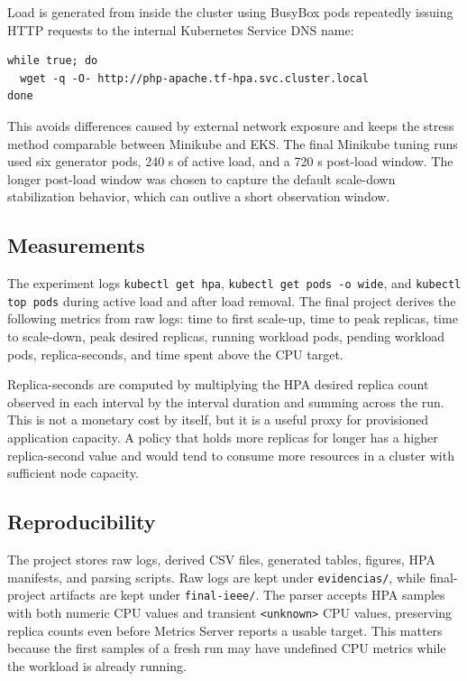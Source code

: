 \documentclass[conference]{IEEEtran}
\begin{document}
Load is generated from inside the cluster using BusyBox pods repeatedly issuing HTTP requests to the internal Kubernetes Service DNS name:

\begin{lstlisting}
while true; do
  wget -q -O- http://php-apache.tf-hpa.svc.cluster.local
done
\end{lstlisting}

This avoids differences caused by external network exposure and keeps the stress method comparable between Minikube and EKS. The final Minikube tuning runs used six generator pods, 240 s of active load, and a 720 s post-load window. The longer post-load window was chosen to capture the default scale-down stabilization behavior, which can outlive a short observation window.

\subsection{Measurements}

The experiment logs \texttt{kubectl get hpa}, \texttt{kubectl get pods -o wide}, and \texttt{kubectl top pods} during active load and after load removal. The final project derives the following metrics from raw logs: time to first scale-up, time to peak replicas, time to scale-down, peak desired replicas, running workload pods, pending workload pods, replica-seconds, and time spent above the CPU target.

Replica-seconds are computed by multiplying the HPA desired replica count observed in each interval by the interval duration and summing across the run. This is not a monetary cost by itself, but it is a useful proxy for provisioned application capacity. A policy that holds more replicas for longer has a higher replica-second value and would tend to consume more resources in a cluster with sufficient node capacity.

\subsection{Reproducibility}

The project stores raw logs, derived CSV files, generated tables, figures, HPA manifests, and parsing scripts. Raw logs are kept under \texttt{evidencias/}, while final-project artifacts are kept under \texttt{final-ieee/}. The parser accepts HPA samples with both numeric CPU values and transient \texttt{<unknown>} CPU values, preserving replica counts even before Metrics Server reports a usable target. This matters because the first samples of a fresh run may have undefined CPU metrics while the workload is already running.
\end{document}
